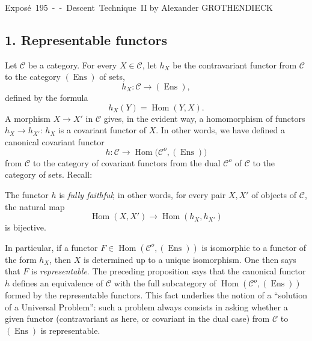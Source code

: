 \unit{Exposé 195 -- Descent Technique II}
%
  {by Alexander GROTHENDIECK}


\subsection*{1. Representable functors}

Let $\mathcal C$ be a category. For every $X\in\mathcal C$, let $h_X$ be the
contravariant functor from $\mathcal C$ to the category
$(\operatorname{Ens})$ of sets,
\[
  h_X:\mathcal C\longrightarrow(\operatorname{Ens}),
\]
defined by the formula
\[
  h_X(Y)=\operatorname{Hom}(Y,X).
\]
A morphism $X\longrightarrow X'$ in $\mathcal C$ gives, in the evident way, a
homomorphism of functors $h_X\longrightarrow h_{X'}$: $h_X$ is a covariant
functor of $X$. In other words, we have defined a canonical covariant functor
\[
  h:\mathcal C\longrightarrow
  \operatorname{Hom}\bigl(\mathcal C^o,(\operatorname{Ens})\bigr)
\]
from $\mathcal C$ to the category of covariant functors from the dual
$\mathcal C^o$ of $\mathcal C$ to the category of sets. Recall:

 The functor $h$ is \emph{fully faithful}; in other
words, for every pair $X,X'$ of objects of $\mathcal C$, the natural map
\[
  \operatorname{Hom}(X,X')\longrightarrow
  \operatorname{Hom}(h_X,h_{X'})
\]
is bijective.

In particular, if a functor
$F\in\operatorname{Hom}(\mathcal C^o,(\operatorname{Ens}))$ is isomorphic to
a functor of the form $h_X$, then $X$ is determined up to a unique isomorphism.
One then says that $F$ is \emph{representable}. The preceding proposition says
that the canonical functor $h$ defines an equivalence of $\mathcal C$ with the
full subcategory of $\operatorname{Hom}(\mathcal C^o,(\operatorname{Ens}))$
formed by the representable functors. This fact underlies the notion of a
“solution of a Universal Problem”: such a problem always consists in asking
whether a given functor (contravariant as here, or covariant in the dual case)
from $\mathcal C$ to $(\operatorname{Ens})$ is representable.

